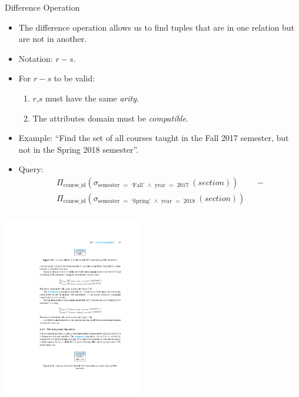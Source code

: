 \documentclass{beamer}
\begin{document}
\begin{frame}{Difference Operation}
    \begin{itemize}
        \item The difference operation allows us to find tuples that are in one relation but are not in another.
        \item Notation: {\Large $r - s$}.
        \item For $r - s$ to be valid:
        \begin{enumerate}
            \item $r$,$s$ must have the same \textit{arity}.
            \item The attributes domain must be \textit{compatible}.
        \end{enumerate}
        \item Example: ``Find the set of all courses taught in the Fall 2017 semester, but not in the Spring 2018 semester''.
        \item Query:
        \begin{equation*}
            \begin{split}
                \Pi_{\text{course\_id}} (\sigma_{ \text{semester } = \text{ `Fall' } \wedge \text{ year } = \text{ 2017 } } (section) ) & \text{ } - \\
                \Pi_{\text{course\_id}} (\sigma_{ \text{semester } = \text{ `Spring' } \wedge \text{ year } = \text{ 2018 } } (section) ) & \\
            \end{split}
        \end{equation*}
    \end{itemize}
    \centering
    \includegraphics[width=0.45\textwidth, trim={9.50cm 4.50cm 7.50cm 21.00cm}, clip]{figures/db_intersection}    
\end{frame}
\end{document}
